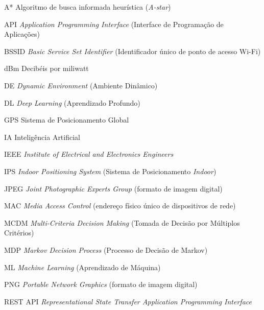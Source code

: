 \documentclass[
    12pt,                %
    openright,           %
    oneside,             %
    a4paper,             %
    english,             %
    brazil               %
]{abntex2}
\begin{document}
\listoffigures*
\cleardoublepage

\listoftables*
\cleardoublepage

\begin{siglas}
  \item[A*] Algoritmo de busca informada heurística (\textit{A-star})
  \item[API] \textit{Application Programming Interface} (Interface de Programação de Aplicações)
  \item[BSSID] \textit{Basic Service Set Identifier} (Identificador único de ponto de acesso Wi-Fi)
  \item[dBm] Decibéis por miliwatt
  \item[DE] \textit{Dynamic Environment} (Ambiente Dinâmico)
  \item[DL] \textit{Deep Learning} (Aprendizado Profundo)
  \item[GPS] Sistema de Posicionamento Global
  \item[IA] Inteligência Artificial
  \item[IEEE] \textit{Institute of Electrical and Electronics Engineers}
  \item[IPS] \textit{Indoor Positioning System} (Sistema de Posicionamento \textit{Indoor})
  \item[JPEG] \textit{Joint Photographic Experts Group} (formato de imagem digital)
  \item[MAC] \textit{Media Access Control} (endereço físico único de dispositivos de rede)
  \item[MCDM] \textit{Multi-Criteria Decision Making} (Tomada de Decisão por Múltiplos Critérios)
  \item[MDP] \textit{Markov Decision Process} (Processo de Decisão de Markov)
  \item[ML] \textit{Machine Learning} (Aprendizado de Máquina)
  \item[PNG] \textit{Portable Network Graphics} (formato de imagem digital)
  \item[REST API] \textit{Representational State Transfer Application Programming Interface}

\end{siglas}
\end{document}
